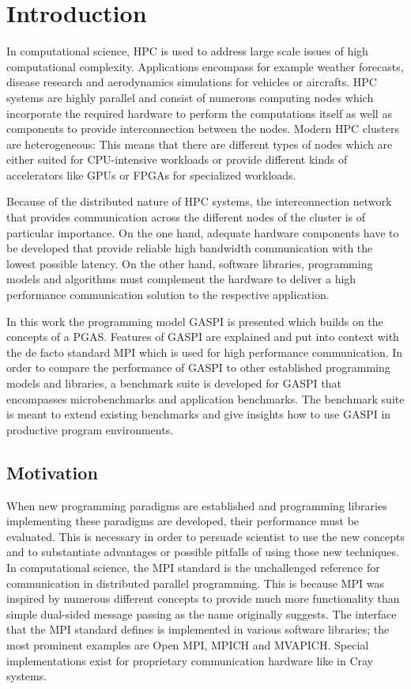 
\chapter{Introduction}

In computational science, \ac{HPC} is used to address large scale issues of high computational complexity. Applications encompass for example weather forecasts, disease research and aerodynamics simulations for vehicles or aircrafts. \Ac{HPC} systems are highly parallel and consist of numerous computing nodes which incorporate the required hardware to perform the computations itself as well as components to provide interconnection between the nodes. Modern \ac{HPC} clusters are heterogeneous: This means that there are different types of nodes which are either suited for \eg \acs{CPU}-intensive workloads or provide different kinds of accelerators like \acsp{GPU} or \acsp{FPGA} for specialized workloads. 

Because of the distributed nature of \ac{HPC} systems, the interconnection network that provides communication across the different nodes of the cluster is of par\-ti\-cu\-lar importance. On the one hand, adequate hardware components have to be developed that provide reliable high bandwidth communication with the lowest possible latency. On the other hand, software libraries, programming models and algorithms must complement the hardware to deliver a high performance communication solution to the respective application.

In this work the programming model \ac{GASPI} is presented which builds on the concepts of a \ac{PGAS}. Features of \ac{GASPI} are explained and put into context with the de facto standard \ac{MPI} which is used for high performance communication. In order to compare the performance of \ac{GASPI} to other established programming models and libraries, a benchmark suite is developed for \ac{GASPI} that encompasses microbenchmarks and application benchmarks. The benchmark suite is meant to extend existing benchmarks and give insights how to use \ac{GASPI} in productive program environments. 

\section{Motivation}

When new programming paradigms are established and programming libraries implementing these paradigms are developed, their performance must be evaluated. This is necessary in order to persuade scientist to use the new concepts and to substantiate advantages or possible pitfalls of using those new techniques. In computational science, the \ac{MPI} standard is the unchallenged reference for communication in distributed parallel programming. This is because \ac{MPI} was inspired by numerous different concepts to provide much more functionality than simple dual-sided message passing as the name originally suggests. The interface that the \ac{MPI} standard defines is implemented in various software libraries; the most prominent examples are Open MPI, MPICH and MVAPICH. Special implementations exist for proprietary communication hardware like \eg in Cray systems.


